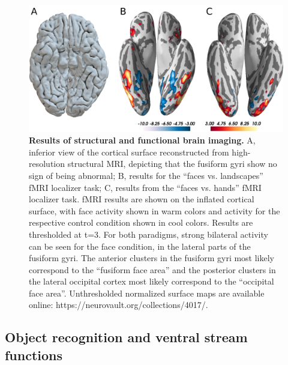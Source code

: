 \documentclass[fleqn,10pt]{SelfArx} %
\begin{document}
\begin{figure}[htbp]
	
	\renewcommand{\familydefault}{\sfdefault}\normalfont
	\centering
	\includegraphics[width=\columnwidth]{../reports/figures/brain_main_figure.png}
	\vspace*{-3mm}
  		\caption{\textbf{Results of structural and functional brain imaging.} A, inferior view of the cortical surface reconstructed from high-resolution structural MRI, depicting that the fusiform gyri show no sign of being abnormal; B, results for the “faces vs. landscapes” fMRI localizer task; C, results from the “faces vs. hands” fMRI localizer task. fMRI results are shown on the inflated cortical surface, with face activity shown in warm colors and activity for the respective control condition shown in cool colors. Results are thresholded at t=3. For both paradigms, strong bilateral activity can be seen for the face condition, in the lateral parts of the fusiform gyri. The anterior clusters in the fusiform gyri most likely correspond to the “fusiform face area” and the posterior clusters in the lateral occipital cortex most likely correspond to the “occipital face area”. Unthresholded normalized surface maps are available online: https://neurovault.org/collections/4017/.}%
  		\label{fig:brain}
	
\end{figure}
  
\subsection*{Object recognition and ventral stream functions}
\end{document}
